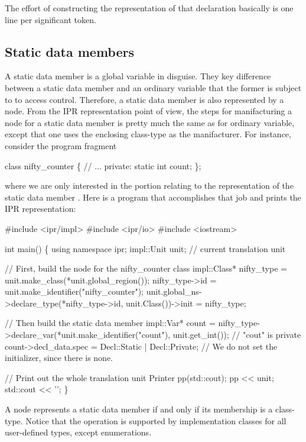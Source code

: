 \documentclass[a4paper,12pt]{article}
\begin{document}
The effort of constructing the representation of that declaration basically is
one line per significant token. 


\subsection{Static data members}
\label{sec:named.data.static-member}

A static data member is a global variable in disguise.  They key difference
between a static data member and an ordinary variable that the former is
subject to to access control.  Therefore, a static data member is also
represented by a  node.  From the IPR representation point of view,
the steps for manifacturing a node for a static data member is pretty much
the same as for ordinary variable, except that one uses the enclosing
class-type as the manifacturer.  For instance, consider the program fragment 
\begin{Program}
  class nifty_counter \{
    // ...
  private:
     static int count;
  \};
\end{Program}
where we are only interested in the portion relating to the representation of
the static data member .  Here is a program that
accomplishes that job and prints the IPR representation:
\begin{Program}
#include <ipr/impl>
#include <ipr/io>
#include <iostream>

int main()
\{
   using namespace ipr;
   impl::Unit unit;              // current translation unit

   // First, build the node for the nifty_counter class
   impl::Class* nifty_type = unit.make_class(*unit.global_region());
   nifty_type->id = unit.make_identifier("nifty_counter");
   unit.global_ns->declare_type(*nifty_type->id, unit.Class())->init
      = nifty_type;
   
   // Then build the static data member
   impl::Var* count = nifty_type->declare_var(*unit.make_identifier("count"),
                                              unit.get_int());
   // "cout" is private 
   count->decl_data.spec = Decl::Static | Decl::Private;
   // We do not set the initializer, since there is none.
   
   // Print out the whole translation unit
   Printer pp(std::cout);
   pp << unit;
   std::cout << '';
\}
\end{Program}

A  node represents a static data member if and only if its
membership is a class-type.  Notice that the operation 
is supported by implementation classes for all user-defined types, except
enumerations. 
\end{document}
